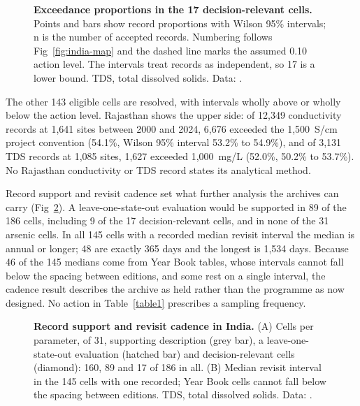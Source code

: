 \documentclass[10pt,letterpaper]{article}
\begin{document}
\begin{figure}[!ht]
\caption{\textbf{Exceedance proportions in the 17 decision-relevant cells.} Points and bars show record proportions with Wilson 95\% intervals; n is the number of accepted records. Numbering follows Fig~\ref{fig:india-map} and the dashed line marks the assumed 0.10 action level. The intervals treat records as independent, so 17 is a lower bound. TDS, total dissolved solids. Data: .}
\label{fig:india-intervals}
\end{figure}

The other 143 eligible cells are resolved, with intervals wholly above or wholly below the action level. Rajasthan shows the upper side: of 12,349 conductivity records at 1,641 sites between 2000 and 2024, 6,676 exceeded the 1,500~\textmu{}S/cm project convention (54.1\%, Wilson 95\% interval 53.2\% to 54.9\%), and of 3,131 TDS records at 1,085 sites, 1,627 exceeded 1,000~mg/L (52.0\%, 50.2\% to 53.7\%). No Rajasthan conductivity or TDS record states its analytical method.

Record support and revisit cadence set what further analysis the archives can carry (Fig~\ref{fig:india-support-cadence}). A leave-one-state-out evaluation would be supported in 89 of the 186 cells, including 9 of the 17 decision-relevant cells, and in none of the 31 arsenic cells. In all 145 cells with a recorded median revisit interval the median is annual or longer; 48 are exactly 365 days and the longest is 1,534 days. Because 46 of the 145 medians come from Year Book tables, whose intervals cannot fall below the spacing between editions, and some rest on a single interval, the cadence result describes the archive as held rather than the programme as now designed. No action in Table~\ref{table1} prescribes a sampling frequency.\label{callout:fig:india-support-cadence}

\begin{figure}[!ht]
\caption{\textbf{Record support and revisit cadence in India.} (A) Cells per parameter, of 31, supporting description (grey bar), a leave-one-state-out evaluation (hatched bar) and decision-relevant cells (diamond): 160, 89 and 17 of 186 in all. (B) Median revisit interval in the 145 cells with one recorded; Year Book cells cannot fall below the spacing between editions. TDS, total dissolved solids. Data: .}
\label{fig:india-support-cadence}
\end{figure}

\FloatBarrier
\end{document}
